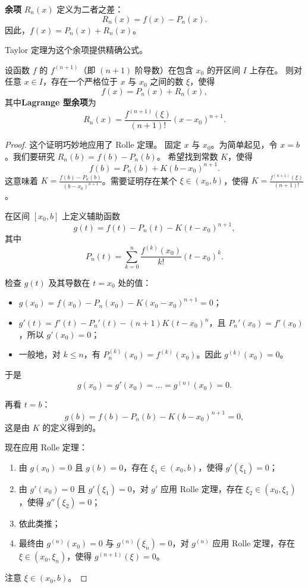 \begin{definition}[余项]
\textbf{余项} $R_n(x)$ 定义为二者之差：
\[
R_n(x)=f(x)-P_n(x).
\]
因此，$f(x)=P_n(x)+R_n(x)$。
\end{definition}

Taylor 定理为这个余项提供精确公式。



\begin{theorem}
\label{thm:taylor_cn}
设函数 $f$ 的 $f^{(n+1)}$（即 $(n+1)$ 阶导数）在包含 $x_0$ 的开区间 $I$ 上存在。
则对任意 $x\in I$，存在一个严格位于 $x$ 与 $x_0$ 之间的数 $\xi$，使得
\[
f(x)=P_n(x)+R_n(x),
\]
其中\textbf{Lagrange 型余项}为
\[
R_n(x)=\frac{f^{(n+1)}(\xi)}{(n+1)!}(x-x_0)^{n+1}.
\]
\end{theorem}

\begin{proof}
这个证明巧妙地应用了 Rolle 定理。
固定 $x$ 与 $x_0$。为简单起见，令 $x=b$。我们要研究 $R_n(b)=f(b)-P_n(b)$。
希望找到常数 $K$，使得
\[
f(b)=P_n(b)+K(b-x_0)^{n+1}.
\]
这意味着 $K=\frac{f(b)-P_n(b)}{(b-x_0)^{n+1}}$。需要证明存在某个 $\xi\in(x_0,b)$，使得 $K=\frac{f^{(n+1)}(\xi)}{(n+1)!}$。

在区间 $[x_0,b]$ 上定义辅助函数
\[
g(t)=f(t)-P_n(t)-K(t-x_0)^{n+1},
\]
其中
\[
P_n(t)=\sum_{k=0}^n\frac{f^{(k)}(x_0)}{k!}(t-x_0)^k.
\]

检查 $g(t)$ 及其导数在 $t=x_0$ 处的值：
\begin{itemize}
    \item $g(x_0)=f(x_0)-P_n(x_0)-K(x_0-x_0)^{n+1}=0$；
    \item $g'(t)=f'(t)-P_n'(t)-(n+1)K(t-x_0)^n$，且 $P_n'(x_0)=f'(x_0)$，所以 $g'(x_0)=0$；
    \item 一般地，对 $k\le n$，有 $P_n^{(k)}(x_0)=f^{(k)}(x_0)$。因此 $g^{(k)}(x_0)=0$。
\end{itemize}
于是
\[
g(x_0)=g'(x_0)=\dots=g^{(n)}(x_0)=0.
\]

再看 $t=b$：
\[
g(b)=f(b)-P_n(b)-K(b-x_0)^{n+1}=0,
\]
这是由 $K$ 的定义得到的。

现在应用 Rolle 定理：
\begin{enumerate}
    \item 由 $g(x_0)=0$ 且 $g(b)=0$，存在 $\xi_1\in(x_0,b)$，使得 $g'(\xi_1)=0$；
    \item 由 $g'(x_0)=0$ 且 $g'(\xi_1)=0$，对 $g'$ 应用 Rolle 定理，存在 $\xi_2\in(x_0,\xi_1)$，使得 $g''(\xi_2)=0$；
    \item 依此类推；
    \item 最终由 $g^{(n)}(x_0)=0$ 与 $g^{(n)}(\xi_n)=0$，对 $g^{(n)}$ 应用 Rolle 定理，存在 $\xi\in(x_0,\xi_n)$，使得 $g^{(n+1)}(\xi)=0$。
\end{enumerate}
注意 $\xi\in(x_0,b)$。


\end{proof}
